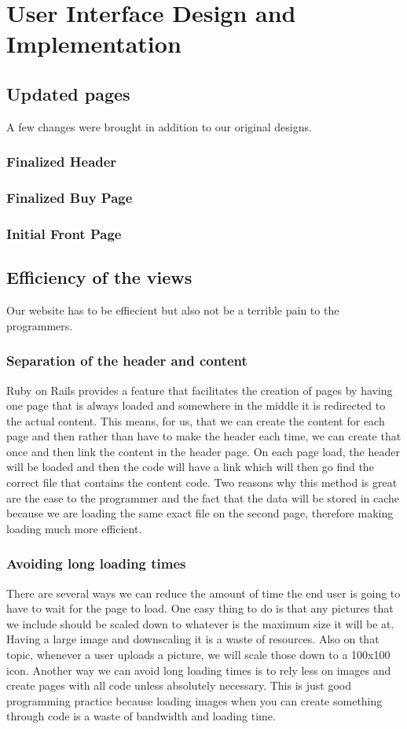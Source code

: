 \chapter{User Interface Design and Implementation}

\section{Updated pages}
A few changes were brought in addition to our original designs.
\subsection{Finalized Header}
\subsection{Finalized Buy Page}
\subsection{Initial Front Page}


\section{Efficiency of the views}
Our website has to be effiecient but also not be a terrible pain to the programmers. 
\subsection{Separation of the header and content}
Ruby on Rails provides a feature that facilitates the creation of pages by having one page that is always loaded and somewhere in the middle it is redirected to the actual content. This means, for us, that we can create the content for each page and then rather than have to make the header each time, we can create that once and then link the content in the header page. On each page load, the header will be loaded and then the code will have a link which will then go find the correct file that contains the content code. Two reasons why this method is great are the ease to the programmer and the fact that the data will be stored in cache because we are loading the same exact file on the second page, therefore making loading much more efficient.
\subsection{Avoiding long loading times}
There are several ways we can reduce the amount of time the end user is going to have to wait for the page to load. One easy thing to do is that any pictures that we include should be scaled down to whatever is the maximum size it will be at. Having a large image and downscaling it is a waste of resources. Also on that topic, whenever a user uploads a picture, we will scale those down to a 100x100 icon. Another way we can avoid long loading times is to rely less on images and create pages with all code unless absolutely necessary. This is just good programming practice because loading images when you can create something through code is a waste of bandwidth and loading time. 
